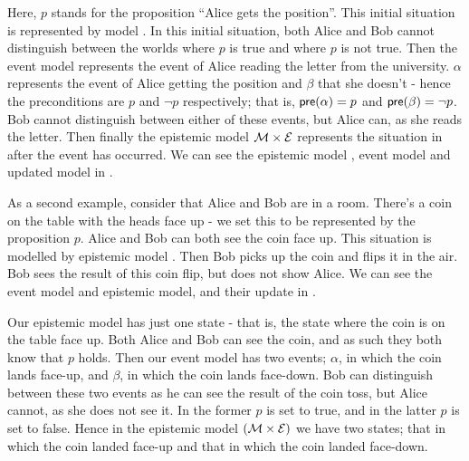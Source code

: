 \documentclass[10pt, a4paper]{report}
\begin{document}
Here, $p$ stands for the proposition ``Alice gets the position''. This initial
situation is represented by model . In this initial situation, both Alice
and Bob cannot distinguish between the worlds where $p$ is true and where $p$ is
not true. Then the event model  represents the event of Alice reading the letter
from the university. $\alpha$ represents the event of Alice getting the position
and $\beta$ that she doesn't - hence the preconditions are $p$ and $\neg
p$ respectively; that is, $\textsf{pre}(\alpha) = p$ and $\textsf{pre}(\beta) = \neg p$. Bob
cannot distinguish between either of these events, but Alice can, as she reads
the letter. Then finally the epistemic model $\mathcal{M} \times \mathcal{E}$ represents the situation
in  after the event  has occurred. We can see the epistemic model ,
event model  and updated model  in .

As a second example, consider that Alice and Bob are in a room. There's a coin
on the table with the heads face up - we set this to be represented by the
proposition $p$. Alice and Bob can both see the coin face up. This situation is
modelled by epistemic model . Then Bob picks up the coin and flips it in
the air. Bob sees the result of this coin flip, but does not show Alice. We can
see the event model and epistemic model, and their update in
.

Our epistemic model has just one state - that is, the state where the coin is on
the table face up. Both Alice and Bob can see the coin, and as such they both
know that $p$ holds. Then our event model has two events; $\alpha$, in which the
coin lands face-up, and $\beta$, in which the coin lands face-down. Bob can
distinguish between these two events as he can see the result of the coin toss,
but Alice cannot, as she does not see it. In the former $p$ is set to true,
and in the latter $p$ is set to false. Hence in the epistemic model $(\mathcal{M}
\times \mathcal{E})$ we have two states; that in which the coin landed face-up and
that in which the coin landed face-down.
\end{document}

